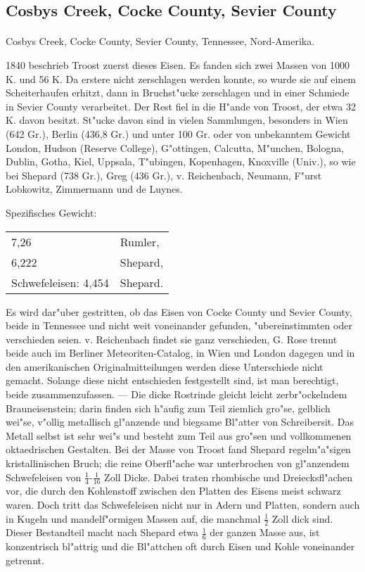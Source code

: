 \documentclass[a4paper, 11pt, oneside]{article}
\begin{document}
\subsection{Cosbys Creek, Cocke County, Sevier County}
\normalsize
\paragraph{}
Cosbys Creek, Cocke County, Sevier County, Tennessee, Nord-Amerika.

1840 beschrieb Troost zuerst dieses Eisen. Es fanden sich zwei Massen von 1000 K. und 56 K. Da erstere nicht zerschlagen werden konnte, so wurde sie auf einem Scheiterhaufen erhitzt, dann in Bruchst"ucke zerschlagen und in einer Schmiede in Sevier County verarbeitet. Der Rest fiel in die H"ande von Troost, der etwa 32 K. davon besitzt. St"ucke davon sind in vielen Sammlungen, besonders in Wien (642 Gr.), Berlin (436,8 Gr.) und unter 100 Gr. oder von unbekanntem Gewicht London, Hudson (Reserve College), G"ottingen, Calcutta, M"unchen, Bologna, Dublin, Gotha, Kiel, Uppsala, T"ubingen, Kopenhagen, Knoxville (Univ.), so wie bei Shepard (738 Gr.), Greg (436 Gr.), v. Reichenbach, Neumann, F"urst Lobkowitz, Zimmermann und de Luynes.

Spezifisches Gewicht:  
\begin{table}[!ht]
    \centering
    \begin{tabular}{l l}
        7,26 & Rumler,\\
        6,222 & Shepard,\\
        Schwefeleisen: 4,454 & Shepard.
    \end{tabular}
\end{table}

Es wird dar"uber gestritten, ob das Eisen von Cocke County und Sevier County, beide in Tennessee und nicht weit voneinander gefunden, "ubereinstimmten oder verschieden seien. v. Reichenbach findet sie ganz verschieden, G. Rose trennt beide auch im Berliner Meteoriten-Catalog, in Wien und London dagegen und in den amerikanischen Originalmitteilungen werden diese Unterschiede nicht gemacht. Solange diese nicht entschieden festgestellt sind, ist man berechtigt, beide zusammenzufassen. --- Die dicke Rostrinde gleicht leicht zerbr"ockelndem Brauneisenstein; darin finden sich h"aufig zum Teil ziemlich gro"se, gelblich wei"se, v"ollig metallisch gl"anzende und biegsame Bl"atter von Schreibersit. Das Metall selbst ist sehr wei"s und besteht zum Teil aus gro"sen und vollkommenen oktaedrischen Gestalten. Bei der Masse von Troost fand Shepard regelm"a"sigen kristallinischen Bruch; die reine Oberfl"ache war unterbrochen von gl"anzendem Schwefeleisen von $\frac{1}{4}$-$\frac{1}{16}$ Zoll Dicke. Dabei traten rhombische und Dreiecksfl"achen vor, die durch den Kohlenstoff zwischen den Platten des Eisens meist schwarz waren. Doch tritt das Schwefeleisen nicht nur in Adern und Platten, sondern auch in Kugeln und mandelf"ormigen Massen auf, die manchmal $\frac{1}{2}$ Zoll dick sind. Dieser Bestandteil macht nach Shepard etwa $\frac{1}{6}$ der ganzen Masse aus, ist konzentrisch bl"attrig und die Bl"attchen oft durch Eisen und Kohle voneinander getrennt.
\end{document}
